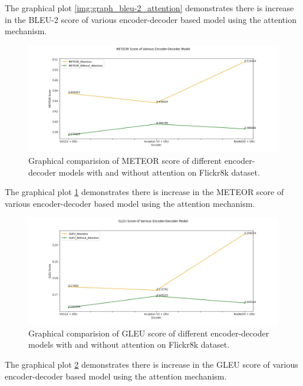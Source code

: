 \noindent The graphical plot \ref{img:graph_bleu-2_attention} demonstrates there is increase in the BLEU-2 score of various encoder-decoder based model using the attention mechanism.

\begin{figure}[ht!]
    \includegraphics[scale=0.5]{chapters/5/intfig/meteor_score_attention.jpg}\hfill
    \caption{Graphical comparision of METEOR score of different encoder-decoder models with and without attention on Flickr8k dataset.}
    \label{img:meteor_attention}
\end{figure}

\noindent The graphical plot \ref{img:meteor_attention} demonstrates there is increase in the METEOR score of various encoder-decoder based model using the attention mechanism.

\begin{figure}[ht!]
    \includegraphics[scale=0.5]{chapters/5/intfig/gleu_score_attention.jpg}\hfill
    \caption{Graphical comparision of GLEU score of different encoder-decoder models with and without attention on Flickr8k dataset.}
    \label{img:gleu_attention}
\end{figure}

\noindent The graphical plot \ref{img:gleu_attention} demonstrates there is increase in the GLEU score of various encoder-decoder based model using the attention mechanism.

